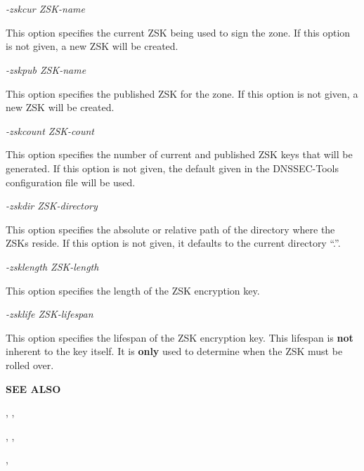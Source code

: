 \begin{description}

\item {\it -zskcur ZSK-name}\verb" "

This option specifies the current ZSK being used to sign the zone.
If this option is not given, a new ZSK will be created.

\item {\it -zskpub ZSK-name}\verb" "

This option specifies the published ZSK for the zone.  If this option
is not given, a new ZSK will be created.

\item {\it -zskcount ZSK-count}\verb" "

This option specifies the number of current and published ZSK keys that will
be generated.  If this option is not given, the default given in the
DNSSEC-Tools configuration file will be used.

\item {\it -zskdir ZSK-directory}\verb" "

This option specifies the absolute or relative path of the directory
where the ZSKs reside.  If this option is not given, it defaults to
the current directory ``.''.

\item {\it -zsklength ZSK-length}\verb" "

This option specifies the length of the ZSK encryption key.

\item {\it -zsklife ZSK-lifespan}\verb" "

This option specifies the lifespan of the ZSK encryption key.  This lifespan
is {\bf not} inherent to the key itself.  It is {\bf only} used to determine
when the ZSK must be rolled over.

\end{description}

{\bf SEE ALSO}

,
,

,
, \\

,
